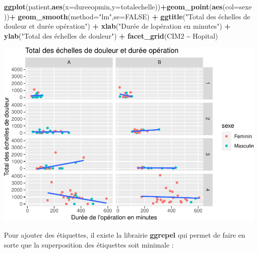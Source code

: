 \documentclass[
]{book}
\newenvironment{Shaded}{\begin{snugshade}}{\end{snugshade}}
\newcommand{\AttributeTok}[1]{\textcolor[rgb]{0.13,0.29,0.53}{#1}}
\newcommand{\ConstantTok}[1]{\textcolor[rgb]{0.56,0.35,0.01}{#1}}
\newcommand{\FunctionTok}[1]{\textcolor[rgb]{0.13,0.29,0.53}{\textbf{#1}}}
\newcommand{\NormalTok}[1]{#1}
\newcommand{\SpecialCharTok}[1]{\textcolor[rgb]{0.81,0.36,0.00}{\textbf{#1}}}
\newcommand{\StringTok}[1]{\textcolor[rgb]{0.31,0.60,0.02}{#1}}
\begin{document}
\begin{Shaded}
\begin{Highlighting}[]
\FunctionTok{ggplot}\NormalTok{(patient,}\FunctionTok{aes}\NormalTok{(}\AttributeTok{x=}\NormalTok{dureeopmin,}\AttributeTok{y=}\NormalTok{totalechelle))}\SpecialCharTok{+}\FunctionTok{geom\_point}\NormalTok{(}\FunctionTok{aes}\NormalTok{(}\AttributeTok{col=}\NormalTok{sexe))}\SpecialCharTok{+}
  \FunctionTok{geom\_smooth}\NormalTok{(}\AttributeTok{method=}\StringTok{"lm"}\NormalTok{,}\AttributeTok{se=}\ConstantTok{FALSE}\NormalTok{) }\SpecialCharTok{+}
  \FunctionTok{ggtitle}\NormalTok{(}\StringTok{"Total des échelles de douleur et durée opération"}\NormalTok{) }\SpecialCharTok{+} 
  \FunctionTok{xlab}\NormalTok{(}\StringTok{"Durée de l\textquotesingle{}opération en minutes"}\NormalTok{) }\SpecialCharTok{+} 
  \FunctionTok{ylab}\NormalTok{(}\StringTok{"Total des échelles de douleur"}\NormalTok{) }\SpecialCharTok{+}
  \FunctionTok{facet\_grid}\NormalTok{(CIM2 }\SpecialCharTok{\textasciitilde{}}\NormalTok{ Hopital)}
\end{Highlighting}
\end{Shaded}

\includegraphics{_main_files/figure-latex/ggplot20-1.pdf}

Pour ajouter des étiquettes, il existe la librairie \textbf{ggrepel} qui permet
de faire en sorte que la superposition des étiquettes soit minimale :
\end{document}
